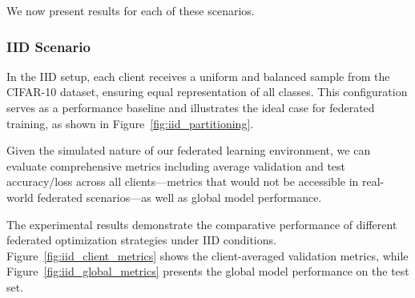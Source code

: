 \documentclass[11pt]{article}
\begin{document}
    We now present results for each of these scenarios.

    \subsubsection{IID Scenario}
    \label{subsubsec:iid-scenario}

    In the IID setup, each client receives a uniform and balanced sample from the CIFAR-10 dataset, ensuring equal representation of all classes. This configuration serves as a performance baseline and illustrates the ideal case for federated training, as shown in Figure~\ref{fig:iid_partitioning}.

    Given the simulated nature of our federated learning environment, we can evaluate comprehensive metrics including average validation and test accuracy/loss across all clients—metrics that would not be accessible in real-world federated scenarios—as well as global model performance.

    The experimental results demonstrate the comparative performance of different federated optimization strategies under IID conditions.
    Figure~\ref{fig:iid_client_metrics} shows the client-averaged validation metrics, while Figure~\ref{fig:iid_global_metrics} presents the global model performance on the test set.
\end{document}
